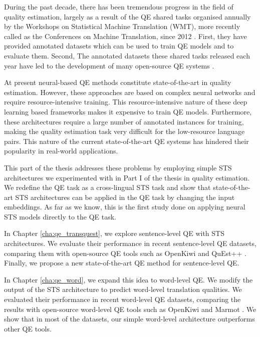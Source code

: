 During the past decade, there has been tremendous progress in the field of quality estimation, largely as a result of the QE shared tasks organised annually by the Workshops on Statistical Machine Translation (WMT), more recently called as the Conferences on Machine Translation, since 2012  \autocite{callison-burch-etal-2012-findings,bojar-etal-2013-findings,bojar-etal-2014-findings,bojar-etal-2015-findings,bojar-etal-2016-findings,bojar-etal-2017-findings,specia-etal-2018-findings,fonseca-etal-2019-findings,specia-etal-2020-findings-wmt}. First, they have provided annotated datasets which can be used to train QE models and to evaluate them. Second, The annotated datasets these shared tasks released each year have led to the development of many open-source QE systems \autocite{specia-etal-2015-multi, ive-etal-2018-deepquest, kepler-etal-2019-openkiwi}. 

At present neural-based QE methods constitute state-of-the-art in quality estimation. However, these approaches are based on complex neural networks and require resource-intensive training. This resource-intensive nature of these deep learning based frameworks makes it expensive to train QE models. Furthermore, these architectures require a large number of annotated instances for training, making the quality estimation task very difficult for the low-resource language pairs. This nature of the current state-of-the-art QE systems has hindered their popularity in real-world applications.

This part of the thesis addresses these problems by employing simple STS architectures we experimented with in Part I of the thesis in quality estimation. We redefine the QE task as a cross-lingual STS task and show that state-of-the-art STS architectures can be applied in the QE task by changing the input embeddings. As far as we know, this is the first study done on applying neural STS models directly to the QE task. 

In Chapter \ref{cha:qe_transquest}, we explore sentence-level QE with STS architectures. We evaluate their performance in recent sentence-level QE datasets, comparing them with open-source QE tools such as OpenKiwi \autocite{kepler-etal-2019-openkiwi} and QuEst++ \autocite{specia-etal-2015-multi}. Finally, we propose a new state-of-the-art QE method for sentence-level QE.

In Chapter \ref{cha:qe_word}, we expand this idea to word-level QE. We modify the output of the STS architecture to predict word-level translation qualities. We evaluated their performance in recent word-level QE datasets, comparing the results with open-source word-level QE tools such as OpenKiwi \autocite{kepler-etal-2019-openkiwi} and Marmot \autocite{logacheva-etal-2016-marmot}. We show that in most of the datasets, our simple word-level architecture outperforms other QE tools. 

